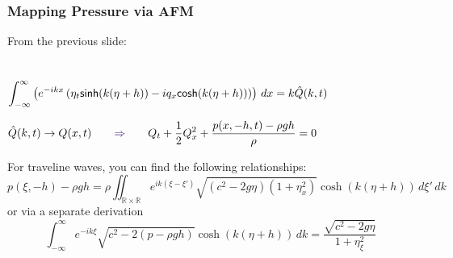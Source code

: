 \begin{frame}[t]
    \frametitle{Mapping Pressure via AFM}
    From the previous slide:\\~\\
    \hfill{}\\
    \hfill \(\displaystyle \int_{-\infty}^\infty\left(e^{-ikx}\left( \eta_t\textsf{sinh}(k(\eta+h))-iq_x\textsf{cosh}(k(\eta+h)) \right)\right)\,dx=k\hat{Q}(k,t)\)\hfill ~\\

    \pause%
    {
        \vspace*{.1in}
       \begin{center}\(\hat{Q}(k,t) \to Q(x,t) \qquad \emC{\Rightarrow}\qquad \displaystyle Q_t + \frac{1}{2}Q_x^2 + \frac{p(x,-h,t)-\rho g h}{\rho} = 0\) \end{center}
    }
    \pause
    For traveline waves, you can find the following relationships:
    \[p(\xi,-h) - \rho g h = \rho \iint_{\mathbb{R}\times\mathbb{R}}e^{ik(\xi - \xi')}\sqrt{(c^2 - 2 g \eta)(1 + \eta_x^2)}\cosh(k(\eta + h))\,d\xi'\, dk\]
    or via a separate derivation
    \[\int_{-\infty}^{\infty} e^{-i k \xi}\sqrt{c^2 - 2(p - \rho g h)}\cosh(k(\eta + h))\,dk =\frac{\sqrt{c^2 - 2g\eta}}{1 + \eta_\xi^2}\]
\end{frame}

